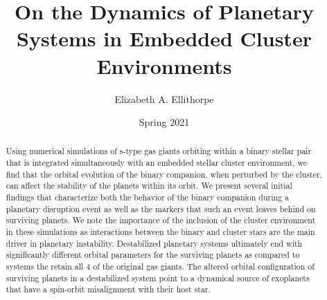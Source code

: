 \documentclass{aastex631}
\begin{document}
\title{On the Dynamics of Planetary Systems in Embedded Cluster Environments}
\author{Elizabeth A. Ellithorpe}
\date{Spring 2021}



\newpage
\begin{abstract}
    Using numerical simulations of s-type gas giants orbiting within a binary stellar pair that is integrated simultaneously with an embedded stellar cluster 
    environment, we find that the orbital evolution of the binary companion, when perturbed by the cluster, can affect the stability of the planets within its orbit.
    We present several initial findings that characterize both the behavior of the binary companion during a planetary 
    disruption event as well as the markers that such an event leaves behind on surviving planets. We note the importance of the inclusion
    of the cluster environment in these simulations as interactions between the binary and cluster stars are the main driver
    in planetary instability. Destabilized planetary systems ultimately end with significantly different orbital parameters for the 
    surviving planets as compared to systems the retain all 4 of the original gas giants. The altered orbital configuration of 
    surviving planets in a destabilized system point to a dynamical source of exoplanets that have a 
    spin-orbit misalignment with their host star. 
\end{abstract}
\end{document}
